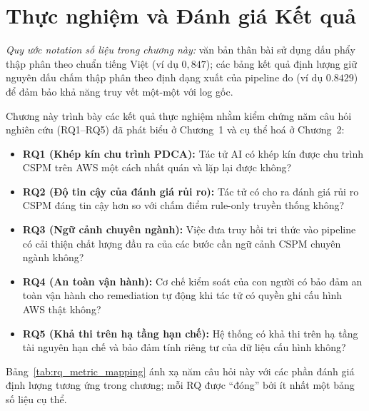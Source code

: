 

\chapter{Thực nghiệm và Đánh giá Kết quả}
\label{ch:eval}

\textit{Quy ước notation số liệu trong chương này:} văn bản thân bài sử dụng dấu phẩy thập phân theo chuẩn tiếng Việt (ví dụ $0{,}847$); các bảng kết quả định lượng giữ nguyên dấu chấm thập phân theo định dạng xuất của pipeline đo (ví dụ $0.8429$) để đảm bảo khả năng truy vết một-một với log gốc.

Chương này trình bày các kết quả thực nghiệm nhằm kiểm chứng năm câu hỏi nghiên cứu (RQ1--RQ5) đã phát biểu ở Chương~1 và cụ thể hoá ở Chương~2:

\begin{itemize}
  \item \textbf{RQ1 (Khép kín chu trình PDCA):} Tác tử AI có khép kín được chu trình CSPM trên AWS một cách nhất quán và lặp lại được không?
  \item \textbf{RQ2 (Độ tin cậy của đánh giá rủi ro):} Tác tử có cho ra đánh giá rủi ro CSPM đáng tin cậy hơn so với chấm điểm rule-only truyền thống không?
  \item \textbf{RQ3 (Ngữ cảnh chuyên ngành):} Việc đưa truy hồi tri thức vào pipeline có cải thiện chất lượng đầu ra của các bước cần ngữ cảnh CSPM chuyên ngành không?
  \item \textbf{RQ4 (An toàn vận hành):} Cơ chế kiểm soát của con người có bảo đảm an toàn vận hành cho remediation tự động khi tác tử có quyền ghi cấu hình AWS thật không?
  \item \textbf{RQ5 (Khả thi trên hạ tầng hạn chế):} Hệ thống có khả thi trên hạ tầng tài nguyên hạn chế và bảo đảm tính riêng tư của dữ liệu cấu hình không?
\end{itemize}

Bảng~\ref{tab:rq_metric_mapping} ánh xạ năm câu hỏi này với các phần đánh giá định lượng tương ứng trong chương; mỗi RQ được ``đóng'' bởi ít nhất một bảng số liệu cụ thể.

